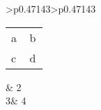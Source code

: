 


\label{0}


\begin{longtable}{>{\RaggedRight}p{0.47143\linewidth}>{\RaggedRight}p{0.47143\linewidth}} 
\hspace*{0pt}\ignorespaces{} 

\begin{tabular}{>{\RaggedRight}p{0.47143\linewidth}>{\RaggedRight}p{0.47143\linewidth}} 
\hspace*{0pt}\ignorespaces{} a &\hspace*{0pt}\ignorespaces{} b\\ 
\hspace*{0pt}\ignorespaces{} c &\hspace*{0pt}\ignorespaces{} d 
\end{tabular}
  &\hspace*{0pt}\ignorespaces{} 2\\ 
\hspace*{0pt}\ignorespaces{} 3&\hspace*{0pt}\ignorespaces{} 4
 
\end{longtable}





